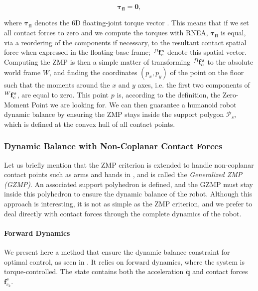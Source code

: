 \begin{equation}
\label{eq:chap3-dynamic-balance-inverse}
 \boldsymbol{\tau_{fl}}=\mathbf{0},
\end{equation}

where $\boldsymbol{\tau_{fl}}$ denotes the 6D floating-joint torque
vector \cite{hirukawa2006universal}. This means that if we set all
contact forces to zero and we compute the torques with RNEA,
$\boldsymbol{\tau_{fl}}$ is equal, via a reordering of the components
if necessary, to the resultant contact spatial force when expressed in
the floating-base frame; $\tensor*[^{fl}]{\mathbf{f}}{_c^s}$ denote
this spatial vector. Computing the ZMP is then a simple matter of
transforming $\tensor*[^{fl}]{\mathbf{f}}{_c^s}$ to the absolute world
frame $W$, and finding the coordinates $(p_x,p_y)$ of the point on the
floor such that the moments around the $x$ and $y$ axes, i.e. the
first two components of $\tensor*[^W]{\mathbf{f}}{_c^s}$, are equal to
zero. This point $p$ is, according to the definition, the Zero-Moment
Point we are looking for. We can then guarantee a humanoid robot
dynamic balance by ensuring the ZMP stays inside the support polygon
$\mathcal{P}_{s}$, which is defined at the convex hull of all contact
points.

\subsubsection{Dynamic Balance with Non-Coplanar Contact Forces}

Let us briefly mention that the ZMP criterion is extended to handle
non-coplanar contact points such as arms and hands in
\cite{harada2003zmp}, and is called the \emph{Generalized ZMP
  (GZMP)}. An associated support polyhedron is defined, and the GZMP
must stay inside this polyhedron to ensure the dynamic balance of the
robot. Although this approach is interesting, it is not as simple as
the ZMP criterion, and we prefer to deal directly with contact forces
through the complete dynamics of the robot.

\paragraph{Forward Dynamics}

We present here a method that ensure the dynamic balance constraint
for optimal control, as seen in \cite{mombaur2005open}. It relies on
forward dynamics, where the system is torque-controlled. The state
contains both the acceleration $\ddot{\mathbf{q}}$ and contact forces
$\mathbf{f}^s_{c_k}$. 

